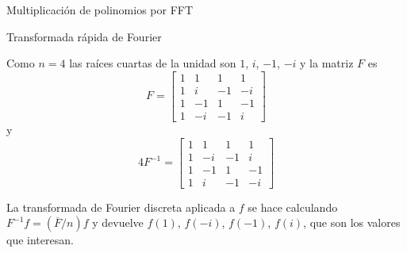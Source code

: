\begin{chapter}{Multiplicación de polinomios por FFT}
\begin{section}{Transformada rápida de Fourier}
\begin{ejemplo*}
            Como $n=4$ las raíces cuartas de la unidad son $1$, $i$, $-1$, $-i$ y   la matriz $F$  es
            \begin{equation*}
                F=\begin{bmatrix}
                    1 & 1 & 1 & 1 \\
                    1 & i & -1 & -i \\
                    1 & -1 & 1 &  -1\\
                    1 & -i & -1 &  i
                \end{bmatrix}
            \end{equation*}
            y 
            \begin{equation*}
                4F^{-1}=\begin{bmatrix}
                    1 & 1 & 1 & 1 \\
                    1 & -i & -1 & i \\
                    1 & -1 & 1 &  -1\\
                    1 & i & -1 &  -i
                \end{bmatrix}
            \end{equation*}
            
            La transformada de Fourier discreta aplicada a $f$ se hace calculando $F^{-1}f = (\overline{F}/n)f$ y  devuelve  $f(1)$, $f(-i)$, $f(-1)$, $f(i)$,  que son los valores que interesan. 
            

\end{ejemplo*}
\end{section}
\end{chapter}

